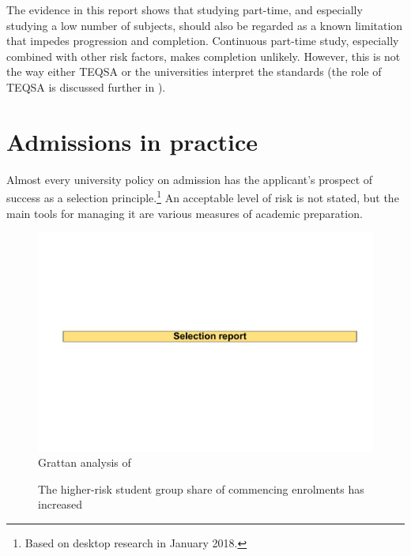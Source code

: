 The evidence in this report shows that studying part-time, and especially studying a low number of subjects, should also be regarded as a known limitation that impedes progression and completion. Continuous part-time study, especially combined with other risk factors, makes completion unlikely. However, this is not the way either TEQSA or the universities interpret the standards (the role of TEQSA is discussed further in ).

\section{Admissions in practice}\label{sec:4.2}

Almost every university policy on admission has the applicant's prospect of success as a selection principle.\footnote{Based on desktop research in January 2018.} An acceptable level of risk is not stated, but the main tools for managing it are various measures of academic preparation.

                \begin{figure}
                    \caption{The higher-risk student group share of commencing enrolments has increased\label{fig:20}}%
                    \includegraphics[page=26]{atlas/selection_chartdeck.pdf} 
                    {Grattan analysis of \textcite{DepartmentofEducationandTraininga}}
                \end{figure}

